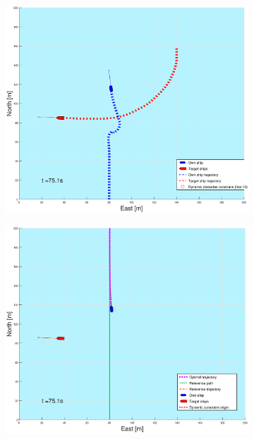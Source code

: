 \begin{figure}[ht]\ContinuedFloat
    \begin{subfigure}[b]{0.49\textwidth}
        \centering
        \includegraphics[width=\textwidth]{Images/Figures/sving_GW/_Simple_0fig1_time=75}
    \end{subfigure}
    \hfill
    \begin{subfigure}[b]{0.499\textwidth}
        \centering
        \includegraphics[width=\textwidth]{Images/Figures/sving_GW/_Simple_0fig999_time=75}

\end{subfigure}
\end{figure}
